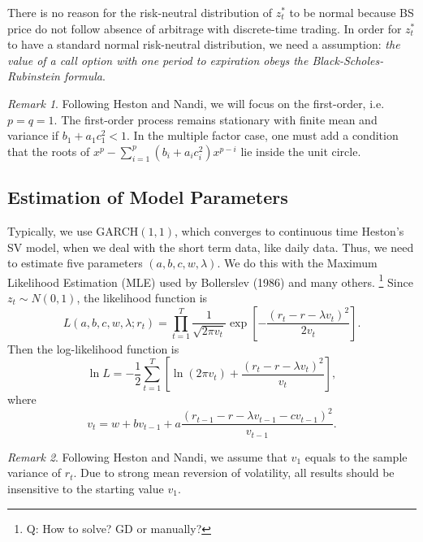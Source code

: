 \documentclass[a4paper,12pt]{article}
\numberwithin{equation}{section}
\theoremstyle{definition}
\theoremstyle{remark}
\newtheorem{remark}{Remark}[section]
\begin{document}
There is no reason for the risk-neutral distribution of $z^{*}_{t}$ 
to be normal because BS price do not follow absence of arbitrage 
with discrete-time trading. In order for $z^{*}_{t}$ to have a 
standard normal risk-neutral distribution, we need a assumption: 
\textit{the value of a call option with one period to expiration 
obeys the Black-Scholes-Rubinstein formula}.

\begin{remark}
Following Heston and Nandi, we will focus on the first-order, i.e. 
$p=q=1$. The first-order process remains stationary with finite 
mean and variance if $b_{1}+a_{1}c_{1}^{2}<1$. In the multiple 
factor case, one must add a condition that the roots of 
$x^{p}-\sum_{i=1}^{p}(b_{i}+a_{i}c_{i}^{2})x^{p-i}$ lie inside the 
unit circle.
\end{remark}

\subsection{Estimation of Model Parameters}
Typically, we use GARCH$(1,1)$, which converges to continuous time 
Heston's SV model, when we deal with the short term data, like 
daily data. Thus, we need to estimate five parameters 
$(a,b,c,w,\lambda)$. We do this with the Maximum Likelihood 
Estimation (MLE) used by Bollerslev (1986) and many others.
\footnote{Q: How to solve? GD or manually?} Since 
$z_{t}\sim N(0,1)$, the likelihood function is 
\begin{equation}
    L(a,b,c,w,\lambda;r_{t})
    =\prod_{t=1}^{T}\frac{1}{\sqrt{2\pi v_{t}}}\exp\left[
        -\frac{(r_{t}-r-\lambda v_{t})^{2}}{2v_{t}}\right].
\end{equation}
Then the log-likelihood function is 
\begin{equation}
    \ln L=-\frac{1}{2}\sum_{t=1}^{T}\left[\ln(2\pi v_{t})
    +\frac{(r_{t}-r-\lambda v_{t})^{2}}{v_{t}}\right],
\end{equation}
where 
\begin{equation}
    v_{t}=w+bv_{t-1}+a
    \frac{(r_{t-1}-r-\lambda v_{t-1}-cv_{t-1})^{2}}{v_{t-1}}.
\end{equation}

\begin{remark}
Following Heston and Nandi, we assume that $v_{1}$ equals to the 
sample variance of $r_t$. Due to strong mean reversion of 
volatility, all results should be insensitive to the starting value 
$v_{1}$.
\end{remark}
\end{document}
